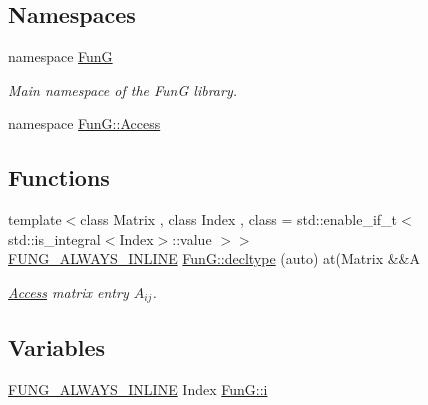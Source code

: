 \subsection*{\-Namespaces}
\begin{DoxyCompactItemize}
\item 
namespace \hyperlink{namespaceFunG}{\-Fun\-G}
\begin{DoxyCompactList}\small\item\em \-Main namespace of the \-Fun\-G library. \end{DoxyCompactList}\item 
namespace \hyperlink{namespaceFunG_1_1Access}{\-Fun\-G\-::\-Access}
\end{DoxyCompactItemize}
\subsection*{\-Functions}
\begin{DoxyCompactItemize}
\item 
{\footnotesize template$<$class Matrix , class Index , class  = std\-::enable\-\_\-if\-\_\-t$<$ std\-::is\-\_\-integral$<$\-Index$>$\-::value $>$$>$ }\\\hyperlink{macros_8hh_a03b9da186125795e5afa49d0ef1cc32f}{\-F\-U\-N\-G\-\_\-\-A\-L\-W\-A\-Y\-S\-\_\-\-I\-N\-L\-I\-N\-E} \hyperlink{namespaceFunG_a008e627afadc16205f1a9f1469af1d76}{\-Fun\-G\-::decltype} (auto) at(\-Matrix \&\&\-A
\begin{DoxyCompactList}\small\item\em \hyperlink{namespaceFunG_1_1Access}{\-Access} matrix entry $A_{ij}$. \end{DoxyCompactList}\end{DoxyCompactItemize}
\subsection*{\-Variables}
\begin{DoxyCompactItemize}
\item 
\hyperlink{macros_8hh_a03b9da186125795e5afa49d0ef1cc32f}{\-F\-U\-N\-G\-\_\-\-A\-L\-W\-A\-Y\-S\-\_\-\-I\-N\-L\-I\-N\-E} \-Index \hyperlink{namespaceFunG_a596429cd53658fe4796a76dd39d6a8da}{\-Fun\-G\-::i}
\end{DoxyCompactItemize}
